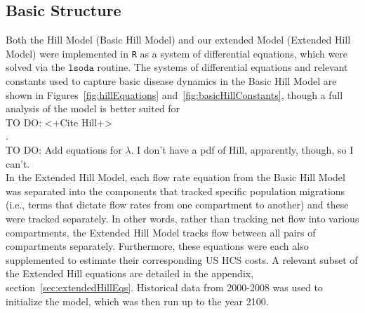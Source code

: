 \documentclass{amsart}
\newcommand{\TODO}[1]{\hfill\\{\huge \color{red} TO DO:} #1 \hfill \\}
\begin{document}
\subsection{Basic Structure}
Both the Hill Model (Basic Hill Model) and our extended Model (Extended Hill
Model) were implemented in \texttt{R} as a system of differential equations,
which were solved via the $\texttt{lsoda}$ routine. The systems of differential
equations and relevant constants used to capture basic disease dynamics in the
Basic Hill Model are shown in Figures~\ref{fig:hillEquations}
and~\ref{fig:basicHillConstants}, though a full analysis of the model is better
suited for \TODO{<+Cite Hill+>}. \TODO{Add equations for $\lambda$. I don't have
a pdf of Hill, apparently, though, so I can't.}  In the Extended Hill Model,
each flow rate equation from the Basic Hill Model was separated into the
components that tracked specific population migrations (i.e., terms that dictate
flow rates from one compartment to another) and these were tracked separately.
In other words, rather than tracking net flow into various compartments, the
Extended Hill Model tracks flow between all pairs of compartments separately.
Furthermore, these equations were each also supplemented to estimate their
corresponding US HCS costs. A relevant subset of the Extended Hill equations are
detailed in the appendix, section~\ref{sec:extendedHillEqs}. Historical data
from 2000-2008 was used to initialize the model, which was then run up to the
year 2100.  
\end{document}
